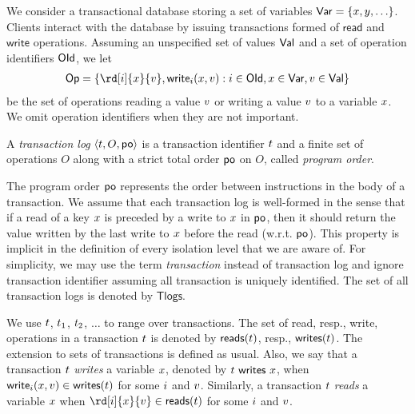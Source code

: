 We consider a transactional database storing a set of variables $\Var=\{\xvar,\yvar,\ldots\}$. Clients interact with the database by issuing transactions formed of $\textsf{read}$ and $\textsf{write}$ operations. Assuming an unspecified set of values $\Val$ and a set of operation identifiers $\OId$, we let 
\begin{align*}
 \Op=\set{\rd[\id]{\xvar}{\val},\wrt[\id]{\xvar}{\val}: \id\in\OId, \xvar\in\Var, \val\in \Val}
\end{align*} 
be the set of operations reading a value $\val$ or writing a value $\val$ to a variable $\xvar$. We omit operation identifiers when they are not important.

\begin{definition}
 A \emph{transaction log} $\tup{\tr, O, \po}$ is a transaction identifier $\tr$ and a finite set of operations $O$ along with a strict total order $\po$ on $O$, called \emph{program order}.
\end{definition}

The program order $\po$ represents the order between instructions in the body of a transaction. We assume that each transaction log is well-formed in the sense that if a read of a key $\xvar$ is preceded by a write to $\xvar$ in $\po$, then it should return the value written by the last write to $\xvar$ before the read (w.r.t. $\po$). This property is implicit in the definition of every isolation level that we are aware of. For simplicity, we may use the term \emph{transaction} instead of transaction log and ignore transaction identifier assuming all transaction is uniquely identified. The  set of all transaction logs is denoted by $\mathsf{Tlogs}$.

We use $\tr$, $\tr_1$, $\tr_2$, $\ldots$ to range over transactions. The set of read, resp., write, operations in a transaction $\tr$ is denoted by $\readOp{\tr}$, resp., $\writeOp{\tr}$. The extension to sets of transactions is defined as usual. Also, we say that a transaction $\tr$ \emph{writes} a variable $\xvar$, denoted by $\writeVar{\tr}{\xvar}$, when $\wrt[\id]{\xvar}{\val}\in \writeOp{\tr}$ for some $\id$ and $\val$. Similarly, a transaction $\tr$ \emph{reads} a variable $\xvar$ when $\rd[\id]{\xvar}{\val}\in \readOp{\tr}$ for some $\id$ and $\val$.


